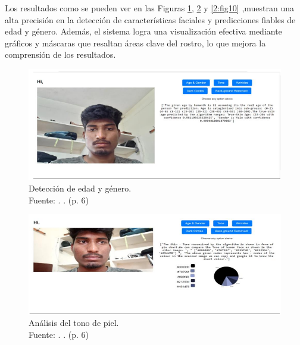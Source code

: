 Los resultados como se pueden ver en las Figuras \ref{2:fig8}, \ref{2:fig9} y \ref{2:fig10} ,muestran una alta precisión en la detección de características faciales y predicciones fiables de edad y género. Además, el sistema logra una visualización efectiva mediante gráficos y máscaras que resaltan áreas clave del rostro, lo que mejora la comprensión de los resultados.  

\begin{figure}[!ht]
	\begin{center}
		\includegraphics[width=1\textwidth]{2/figures/softres1.png}
		\caption[Detección de edad y género]{Detección de edad y género.\\
			Fuente: \cite{Tamilkodi2024}. . (p. 6)}
		\label{2:fig8}
	\end{center}
\end{figure}

\begin{figure}[!ht]
	\begin{center}
		\includegraphics[width=1\textwidth]{2/figures/softres2.png}
		\caption[Análisis del tono de piel]{Análisis del tono de piel.\\
			Fuente: \cite{Tamilkodi2024}. . (p. 6)}
		\label{2:fig9}
	\end{center}
\end{figure}


